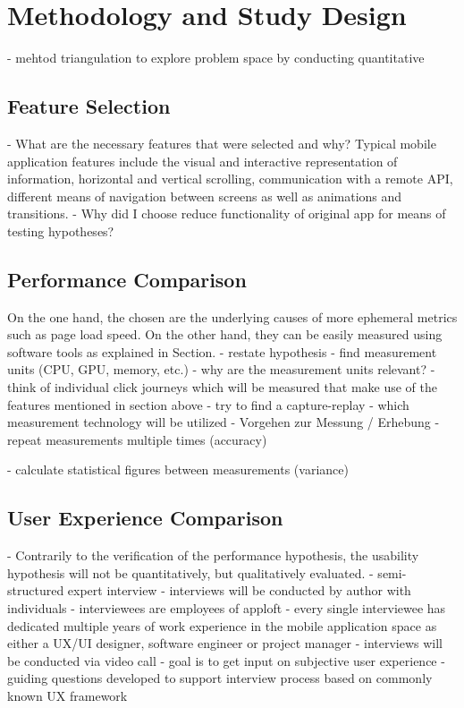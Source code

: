 \chapter{Methodology and Study Design}
- mehtod triangulation to explore problem space by conducting quantitative 

\section{Feature Selection} \label{section::feature_selection}
- What are the necessary features that were selected and why?
Typical mobile application features include the 
visual and interactive representation of information, horizontal and vertical scrolling, 
communication with a remote API, different means of navigation between screens as well as animations and transitions.
- Why did I choose reduce functionality of original app for means of testing hypotheses?

\section{Performance Comparison} \label{section::performance_comparison_design}
On the one hand, the chosen are the underlying causes of more ephemeral metrics such as page load speed. 
On the other hand, they can be easily measured using software tools as explained in Section.
- restate hypothesis
- find measurement units (CPU, GPU, memory, etc.)
- why are the measurement units relevant?
- think of individual click journeys which will be measured that make use of the features mentioned in section above
- try to find a capture-replay
- which measurement technology will be utilized
- Vorgehen zur Messung / Erhebung
- repeat measurements multiple times (accuracy)


- calculate statistical figures between measurements (variance)


\section{User Experience Comparison} \label{section::usability_comparison_design}
- Contrarily to the verification of the performance hypothesis, 
the usability hypothesis will not be quantitatively, but qualitatively evaluated.
- semi-structured expert interview
- interviews will be conducted by author with individuals
- interviewees are employees of apploft
- every single interviewee has dedicated multiple years of work experience in the
 mobile application space as either a UX/UI designer, software engineer or project manager
- interviews will be conducted via video call
- goal is to get input on subjective  user experience
- guiding questions developed to support interview process based on commonly known UX framework
